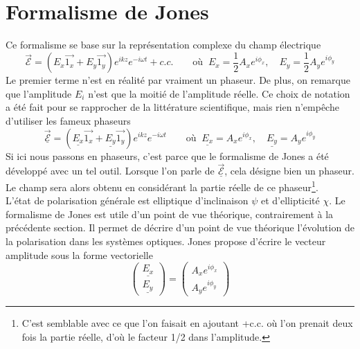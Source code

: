 	
\newpage
\section{Formalisme de Jones}
Ce formalisme se base sur la représentation complexe du champ électrique
\begin{equation}
\vec{\mathcal{E}} = (E_x\vec{1_x}+E_y\vec{1_y})e^{ikz}e^{-i\omega t} + c.c.\qquad\text{où }\ E_x = 
\frac{1}{2}A_xe^{i\phi_x},\quad E_y = \frac{1}{2}A_ye^{i\phi_y}
\end{equation}
Le premier terme n'est en réalité par vraiment un phaseur. De plus, on remarque que l'amplitude 
$E_i$ n'est que la moitié de l'amplitude réelle. Ce choix de notation a été fait pour se rapprocher 
de la littérature scientifique, mais rien n'empêche d'utiliser les fameux phaseurs
\begin{equation}
\underline{\vec{\mathcal{E}}} = (\underline{E_x}\vec{1_x}+\underline{E_y}\vec{1_y})e^{ikz}e^{-i\omega t}\qquad\text{où }\ \underline{E_x} = A_xe^{i\phi_x},\quad \underline{E_y} = A_ye^{i\phi_y}
\end{equation}
Si ici nous passons en phaseurs, c'est parce que le formalisme de Jones a été développé avec un 
tel outil. Lorsque l'on parle de $\underline{\vec{\mathcal{E}}}$, cela désigne bien un phaseur. Le 
champ sera alors obtenu en considérant la partie réelle de ce phaseur\footnote{C'est semblable avec 
ce que l'on faisait en ajoutant +c.c. où l'on prenait deux fois la partie réelle, d'où le facteur 
1/2 dans l'amplitude.}.\\

L'état de polarisation générale est elliptique d'inclinaison $\psi$ et d'ellipticité $\chi$. Le 
formalisme de Jones est utile d'un point de vue théorique, contrairement à la précédente section. 
Il permet de décrire d'un point de vue théorique l'évolution de la polarisation dans les systèmes 
optiques. Jones propose d'écrire le vecteur amplitude sous la forme vectorielle 
\begin{equation}
\left(\begin{array}{c}
\underline{E_x}\\
\underline{E_y}
\end{array}\right) = \left(\begin{array}{c}
A_xe^{i\phi_x}\\
A_ye^{i\phi_y}
\end{array}\right)
\end{equation}

